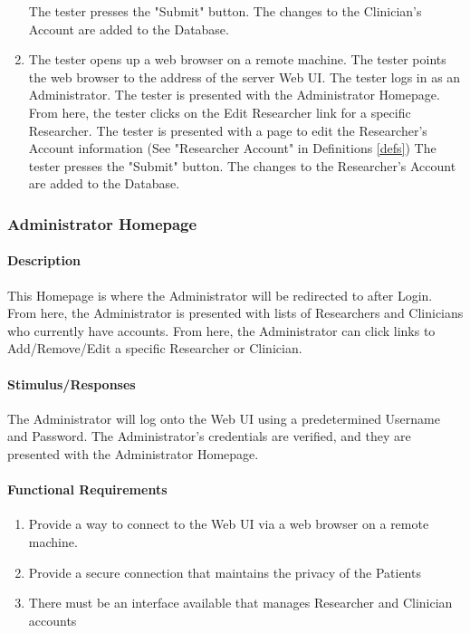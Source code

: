 \documentclass{article}
\begin{document}
\begin{enumerate}
The tester presses the "Submit" button. The changes to the Clinician's Account are added to the Database.
\item The tester opens up a web browser on a remote machine. The tester points the web browser to the address of the server Web UI. The tester logs in as an Administrator. The tester is presented with the Administrator Homepage. From here, the tester clicks on the Edit Researcher link for a specific Researcher. The tester is presented with a page to edit the Researcher's Account information (See "Researcher Account" in Definitions \ref{defs})
The tester presses the "Submit" button. The changes to the Researcher's Account are added to the Database.
\end{enumerate}

\subsubsection {Administrator Homepage} \label{sec: Administrator Homepage}
\paragraph {Description}
This Homepage is where the Administrator will be redirected to after Login. From here, the Administrator is presented with lists of Researchers and Clinicians who currently have accounts.
From here, the Administrator can click links to Add/Remove/Edit a specific Researcher or Clinician.
\paragraph {Stimulus/Responses}
The Administrator will log onto the Web UI using a predetermined Username and Password. The Administrator's credentials are verified, and they are presented with the Administrator Homepage.

\paragraph {Functional Requirements}
\begin{enumerate}
\item Provide a way to connect to the Web UI via a web browser on a remote machine.
\item Provide a secure connection that maintains the privacy of the Patients 
\item There must be an interface available that manages Researcher and Clinician accounts	 
\end{enumerate}
\end{document}
